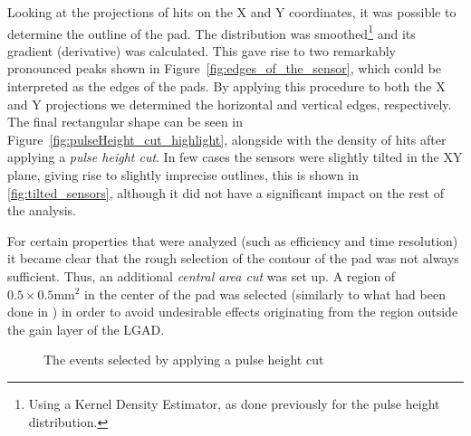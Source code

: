 Looking at the projections of hits on the X and Y coordinates, it was possible to determine the outline of the pad. The distribution was smoothed\footnote{Using a Kernel Density Estimator, as done previously for the pulse height distribution.} and its gradient (derivative) was calculated. This gave rise to two remarkably pronounced peaks shown in Figure~\ref{fig:edges_of_the_sensor}, which could be interpreted as the edges of the pads. By applying this procedure to both the X and Y projections we determined the horizontal and vertical edges, respectively. The final rectangular shape can be seen in Figure~\ref{fig:pulseHeight_cut_highlight}, alongside with the density of hits after applying a \textit{pulse height cut}. In few cases the sensors were slightly tilted in the XY plane, giving rise to slightly imprecise outlines, this is shown in \ref{fig:tilted_sensors}, although it did not have a significant impact on the rest of the analysis.


For certain properties that were analyzed (such as efficiency and time resolution) it became clear that the rough selection of the contour of the pad was not always sufficient. Thus, an additional \textit{central area cut} was set up. A region of \(0.5\times0.5\unit{\milli\meter^2}\) in the center of the pad was selected (similarly to what had been done in \cite{Agapopoulou_2022}) in order to avoid undesirable effects originating from the region outside the gain layer of the LGAD.

\begin{figure}[h!tbp]
    \centering
    \hfill
    \captionsetup{width=\captionwidth}
    \caption{The events selected by applying a pulse height cut}
\end{figure}

